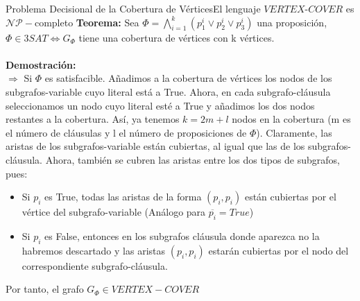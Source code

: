 \documentclass[10pt, envcountsect, presentation, aspectratio=169]{beamer}
\begin{document}
\begin{frame}{Problema Decisional de la Cobertura de Vértices}{El lenguaje $VERTEX\text{-}COVER$ es $\mathcal{NP}-$completo}
    \textbf{Teorema:} Sea $\Phi=\bigwedge_{i=1}^k(p_1^i \vee p_2^i \vee p_3^i)$ una proposición, $\Phi \in 3SAT \Leftrightarrow G_\Phi$  tiene una cobertura de vértices con k vértices. \\~\\

    \textbf{Demostración:} \\
    $\boxed{\Rightarrow}$ Si $\Phi$ es satisfacible. Añadimos a la cobertura de vértices los nodos de los subgrafos-variable cuyo literal está a True. 
    Ahora, en cada subgrafo-cláusula seleccionamos un nodo cuyo literal esté a True y añadimos los dos nodos restantes a la cobertura. Así, ya tenemos $k = 2m + l$ nodos en la cobertura (m es el número de cláusulas y l el número de proposiciones de $\Phi$).
    Claramente, las aristas de los subgrafos-variable están cubiertas, al igual que las de los subgrafos-cláusula. Ahora, también se cubren las aristas entre los dos tipos de subgrafos, pues:
    \begin{itemize}
        \item Si $p_i$ es True, todas las aristas de la forma $(p_i,p_i)$ están cubiertas por el vértice del subgrafo-variable (Análogo para $\overline{p_i} = True$)
        \item Si $p_i$ es False, entonces en los subgrafos cláusula donde aparezca no la habremos descartado y las aristas $(p_i,p_i)$ estarán cubiertas por el nodo del correspondiente subgrafo-cláusula.
    \end{itemize}
    Por tanto, el grafo $G_\Phi \in VERTEX-COVER$
    
\end{frame}
\end{document}
